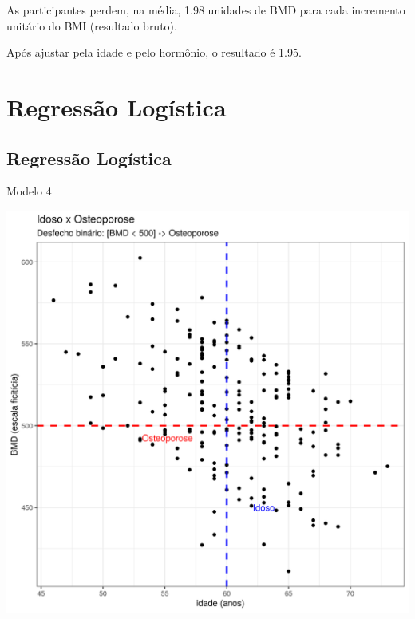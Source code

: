 \documentclass{beamer}
\begin{document}
\begin{frame}{\scriptsize }
  \begin{block}{}
    \footnotesize
    As participantes perdem, na média, 1.98 unidades de BMD para cada incremento unitário do BMI (resultado bruto).

    \bigskip
    Após ajustar pela idade e pelo hormônio, o resultado é 1.95.
  \end{block}
\end{frame}

\section{Regressão Logística}

\subsection{Regressão Logística}

\begin{frame}{\scriptsize Modelo 4}
  \begin{center}
    \includegraphics[height=.9\textheight]{Cap31-32/pratica-glm4}
  \end{center}
\end{frame}
\end{document}
